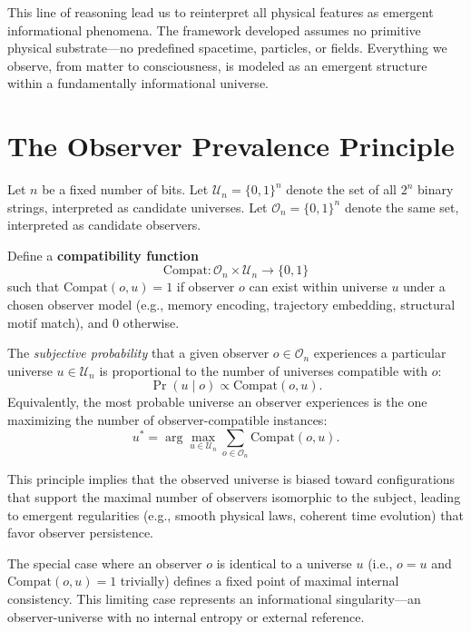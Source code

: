 \documentclass[11pt]{article}
\begin{document}
This line of reasoning lead us to reinterpret all physical features as emergent informational phenomena.  The framework developed assumes no primitive physical substrate—no predefined spacetime, particles, or fields. Everything we observe, from matter to consciousness, is modeled as an emergent structure within a fundamentally informational universe.



\section*{The Observer Prevalence Principle}

Let $n$ be a fixed number of bits. Let $\mathcal{U}_n = \{0,1\}^n$ denote the set of all $2^n$ binary strings, interpreted as candidate universes. Let $\mathcal{O}_n = \{0,1\}^n$ denote the same set, interpreted as candidate observers.

Define a \textbf{compatibility function}
\[
      \mathrm{Compat}: \mathcal{O}_n \times \mathcal{U}_n \rightarrow \{0,1\}
\]
such that $\mathrm{Compat}(o, u) = 1$ if observer $o$ can exist within universe $u$ under a chosen observer model (e.g., memory encoding, trajectory embedding, structural motif match), and 0 otherwise.

\begin{definition}
      The \emph{subjective probability} that a given observer $o \in \mathcal{O}_n$ experiences a particular universe $u \in \mathcal{U}_n$ is proportional to the number of universes compatible with $o$:
      \[
            \Pr(u \mid o) \propto \mathrm{Compat}(o, u).
      \]
      Equivalently, the most probable universe an observer experiences is the one maximizing the number of observer-compatible instances:
      \[
            u^* = \arg\max_{u \in \mathcal{U}_n} \sum_{o \in \mathcal{O}_n} \mathrm{Compat}(o, u).
      \]
\end{definition}

This principle implies that the observed universe is biased toward configurations that support the maximal number of observers isomorphic to the subject, leading to emergent regularities (e.g., smooth physical laws, coherent time evolution) that favor observer persistence.

\begin{remark}
      The special case where an observer $o$ is identical to a universe $u$ (i.e., $o = u$ and $\mathrm{Compat}(o, u) = 1$ trivially) defines a fixed point of maximal internal consistency. This limiting case represents an informational singularity—an observer-universe with no internal entropy or external reference.
\end{remark}
\end{document}
